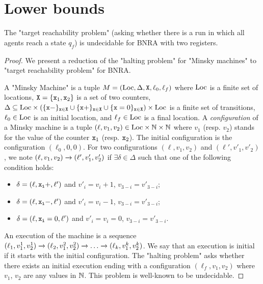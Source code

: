 \section{Lower bounds}



\begin{proposition}
	The "target reachability problem" (asking whether there is a run in which all agents reach a state $q_f$) is undecidable for BNRA with two registers.
\end{proposition}

\ifproofs
\begin{proof}
	We present a reduction of the "halting problem" for "Minsky machines" to "target reachability problem" for BNRA.
	
	A "Minsky Machine" is a tuple $M= (\text{Loc}, \Delta, \mathtt{X}, \ell_0, \ell_f)$ where $\text{Loc}$ is a finite set of locations, $\mathtt{X} = \{\mathtt{x}_1, \mathtt{x}_2\}$ is a set of two counters, $\Delta \subseteq \text{Loc} \times (\{\mathtt{\mathtt{x}}-\}_{\mathtt{x} \in \mathtt{X}} \cup \{\mathtt{\mathtt{x}}+\}_{\mathtt{x} \in \mathtt{X}} \cup \{\mathtt{\mathtt{x}}=0\}_{\mathtt{x} \in \mathtt{X}} ) \times \text{Loc}$ is a finite set of transitions, $\ell_0 \in \text{Loc}$ is an initial location, and $\ell_f \in \text{Loc}$ is a final location. A \emph{configuration} of a Minsky machine is a tuple $(\ell, v_1, v_2) \in \text{Loc} \times \mathbb{N} \times \mathbb{N}$ where $v_1$ (resp. $v_2$) stands for the value of the counter $\mathtt{x}_1$ (resp. $\mathtt{x}_2$). The initial configuration is the configuration $(\ell_0, 0, 0)$.
	For two configurations $(\ell, v_1, v_2)$ and  $(\ell', v'_1, v'_2)$, we note $(\ell, v_1, v_2) \xrightarrow{} (\ell', v'_1, v'_2)$ if $\exists \delta \in \Delta$ such that one of the following condition holds:
	\begin{itemize}
		\item $\delta = (\ell, \mathtt{\mathtt{x}_i}+, \ell')$ and $v'_i = v_i+1$, $v_{3-i} = v'_{3-i}$;
		\item $\delta = (\ell, \mathtt{\mathtt{x}_i}-, \ell')$ and $v'_i = v_i-1$, $v_{3-i} = v'_{3-i}$;
		\item $\delta = (\ell, \mathtt{\mathtt{x}_i}=0, \ell')$ and $v'_i = v_i = 0$, $v_{3-i} = v'_{3-i}$.
	\end{itemize}
	An execution of the machine is a sequence $(\ell_1, v_1^1, v_2^1) \xrightarrow{} (\ell_2, v_1^2, v_2^2) \xrightarrow{} \dots \xrightarrow{} (\ell_k, v_1^k, v_2^k)$. We say that an execution is initial if it starts with the initial configuration.
	The "halting problem" asks whether there exists an initial execution ending with a configuration $(\ell_f, v_1, v_2)$ where $v_1$, $v_2$ are any values in $\mathbb{N}$. This problem is well-known to be undecidable.
	

\end{proof}
